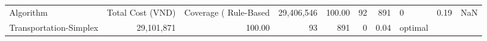 \begin{tabular}{lrrrrrrl}
\toprule
Algorithm & Total Cost (VND) & Coverage (%
\midrule
Rule-Based & 29,406,546 & 100.00 & 92 & 891 & 0 & 0.19 & NaN \\
Transportation-Simplex & 29,101,871 & 100.00 & 93 & 891 & 0 & 0.04 & optimal \\
\bottomrule
\end{tabular}

